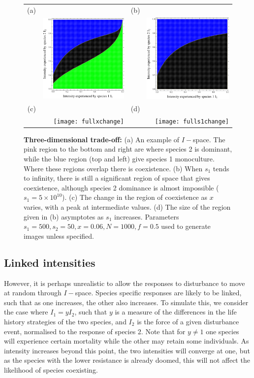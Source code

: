 \documentclass[preprint,10pt,reqno]{amsart}
\begin{document}
\begin{figure}[htbp]
\centering
\begin{tabular}{rrrr}
(a)&&(b)&\\
&\includegraphics[width=2in]{fullexample}&&\includegraphics[width=2in]{fulllarges1} \\
(c)&&(d)&\\
&\texttt{[image: fullxchange]}&&\texttt{[image: fulls1change]}
\end{tabular}
\caption{\textbf{Three-dimensional trade-off:} (a) An example of $I-$space. The pink region to the bottom and right are where species 2 is dominant, while the blue region (top and left) give species 1 monoculture. Where these regions overlap there is coexistence. (b) When $s_1$ tends to infinity, there is still a significant region of space that gives coexistence, although species 2 dominance is almost impossible ($s_1=5\times 10^{10}$). (c) The change in the region of coexistence as $x$ varies, with a peak at intermediate values. (d) The size of the region given in (b) asymptotes as $s_1$ increases. Parameters $s_1=500,s_2=50,x=0.06,N=1000,f=0.5$ used to generate images unless specified.}
\label{full}
\end{figure}

\subsection{Linked intensities}
However, it is perhaps unrealistic to allow the responses to disturbance to move at random through $I-$space. Species specific responses are likely to be linked, such that as one increases, the other also increases. To simulate this, we consider the case where $I_1=yI_2$, such that $y$ is a measure of the differences in the life history strategies of the two species, and $I_2$ is the force of a given disturbance event, normalised to the response of species 2. Note that for $y\neq 1$ one species will experience certain mortality while the other may retain some individuals. As intensity increases beyond this point, the two intensities will converge at one, but as the species with the lower resistance is already doomed, this will not affect the likelihood of species coexisting.
\end{document}
